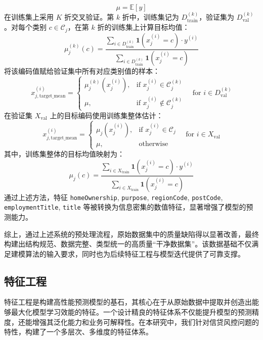 \documentclass{thuemp}
\begin{document}
\begin{itemize}
    \[
    \mu = \mathbb{E}[y]
    \]
    在训练集上采用 $K$ 折交叉验证。第 $k$ 折中，训练集记为 $D_{\text{train}}^{(k)}$，验证集为 $D_{\text{val}}^{(k)}$。对每个类别 $c \in \mathcal{C}_j$，在第 $k$ 折的训练集上计算目标均值：
    \[
    \mu_j^{(k)}(c) = \frac{ \sum_{i \in D_{\text{train}}^{(k)}} \mathbf{1}(x_j^{(i)} = c) \cdot y^{(i)} }
                          { \sum_{i \in D_{\text{train}}^{(k)}} \mathbf{1}(x_j^{(i)} = c) }
    \]
    将该编码值赋给验证集中所有对应类别值的样本：
    \[
    x_{j,\text{target\_mean}}^{(i)} = 
    \begin{cases}
    \mu_j^{(k)}(x_j^{(i)}), & \text{if } x_j^{(i)} \in \mathcal{C}_j^{(k)} \\
    \mu, & \text{if } x_j^{(i)} \notin \mathcal{C}_j^{(k)}
    \end{cases}
    \quad \text{for } i \in D_{\text{val}}^{(k)}
    \]
    在验证集 $X_{\text{val}}$ 上的目标编码使用训练集整体估计：
    \[
    x_{j,\text{target\_mean}}^{(i)} = 
    \begin{cases}
    \mu_j(x_j^{(i)}), & \text{if } x_j^{(i)} \in \mathcal{C}_j \\
    \mu, & \text{otherwise}
    \end{cases}
    \quad \text{for } i \in X_{\text{val}}
    \]
    其中，训练集整体的目标均值映射为：
    \[
    \mu_j(c) = \frac{ \sum_{i \in X_{\text{train}}} \mathbf{1}(x_j^{(i)} = c) \cdot y^{(i)} }
                     { \sum_{i \in X_{\text{train}}} \mathbf{1}(x_j^{(i)} = c) }
    \]
    通过上述方法，特征 \texttt{homeOwnership}, \texttt{purpose}, \texttt{regionCode}, \texttt{postCode}, \texttt{employmentTitle}, \texttt{title} 等被转换为信息密集的数值特征，显著增强了模型的预测能力。
\end{itemize}

\vspace{0.5em}
综上，通过上述系统的预处理流程，原始数据集中的质量缺陷得以显著改善，最终构建出结构规范、数据完整、类型统一的高质量“干净数据集”。该数据基础不仅满足建模算法的输入要求，同时也为后续特征工程与模型迭代提供了可靠支撑。

\subsection{特征工程}
特征工程是构建高性能预测模型的基石，其核心在于从原始数据中提取并创造出能够最大化模型学习效能的特征。一个设计精良的特征体系不仅能提升模型的预测精度，还能增强其泛化能力和业务可解释性。在本研究中，我们针对信贷风控问题的特性，构建了一个多层次、多维度的特征体系。
\end{document}
